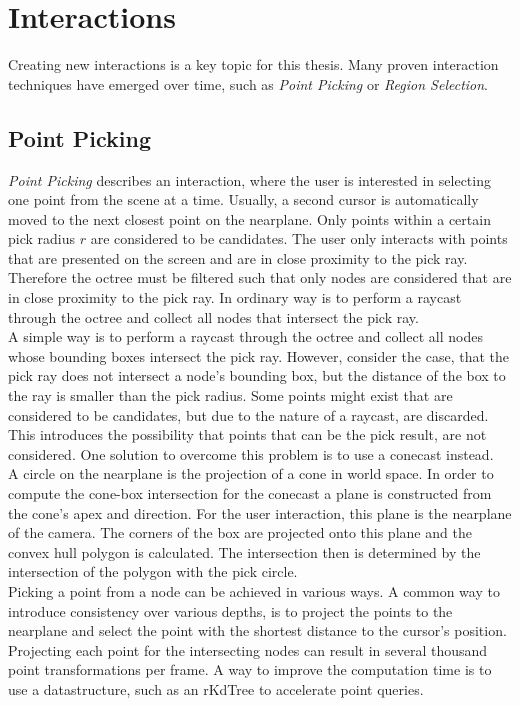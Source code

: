\chapter{Interactions}

Creating new interactions is a key topic for this thesis. Many proven interaction techniques have emerged over time, such as \textit{Point Picking} or \textit{Region Selection}. 

\section{Point Picking}

\textit{Point Picking} describes an interaction, where the user is interested in selecting one point from the scene at a time. Usually, a second cursor is automatically moved to the next closest point on the nearplane. Only points within a certain pick radius $r$ are considered to be candidates. 
The user only interacts with points that are presented on the screen and are in close proximity to the pick ray. Therefore the octree must be filtered such that only nodes are considered that are in close proximity to the pick ray. In ordinary way is to perform a raycast through the octree and collect all nodes that intersect the pick ray. 
\\
A simple way is to perform a raycast through the octree and collect all nodes whose bounding boxes intersect the pick ray. However, consider the case, that the pick ray does not intersect a node's bounding box, but the distance of the box to the ray is smaller than the pick radius. Some points might exist that are considered to be candidates, but due to the nature of a raycast, are discarded. This introduces the possibility that points that can be the pick result, are not considered. One solution to overcome this problem is to use a conecast instead. 
\\
A circle on the nearplane is the projection of a cone in world space. In order to compute the cone-box intersection for the conecast a plane is constructed from the cone's apex and direction. For the user interaction, this plane is the nearplane of the camera. The corners of the box are projected onto this plane and the convex hull polygon is calculated. The intersection then is determined by the intersection of the polygon with the pick circle. 
\\
Picking a point from a node can be achieved in various ways. A common way to introduce consistency over various depths, is to project the points to the nearplane and select the point with the shortest distance to the cursor's position. Projecting each point for the intersecting nodes can result in several thousand point transformations per frame. A way to improve the computation time is to use a datastructure, such as an rKdTree\cite{tobler2011rkd} to accelerate point queries. 
\\

